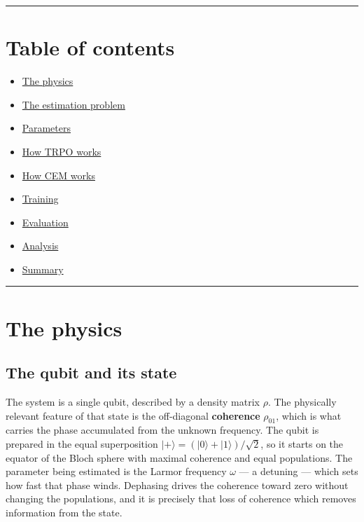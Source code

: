 \documentclass[12pt,a4paper]{article}
\begin{document}
\noindent\rule{\textwidth}{0.4pt}

\section*{Table of contents}
\begin{itemize}
  \item \hyperref[sec:physics]{The physics}
  \item \hyperref[sec:estimation]{The estimation problem}
  \item \hyperref[sec:configuration]{Parameters}
  \item \hyperref[sec:trpo]{How TRPO works}
  \item \hyperref[sec:cem]{How CEM works}
  \item \hyperref[sec:training]{Training}
  \item \hyperref[sec:evaluation]{Evaluation}
  \item \hyperref[sec:analysis]{Analysis}
  \item \hyperref[sec:summary]{Summary}
\end{itemize}

\noindent\rule{\textwidth}{0.4pt}
\FloatBarrier

\section{The physics}
\label{sec:physics}

\subsection{The qubit and its state}
\label{sec:qubit-state}
The system is a single qubit, described by a density matrix $\rho$. The
physically relevant feature of that state is the off-diagonal
\textbf{coherence} $\rho_{01}$, which is what carries the phase accumulated
from the unknown frequency. The qubit is prepared in the equal superposition
$|+\rangle = (|0\rangle + |1\rangle)/\sqrt{2}$, so it starts on the equator
of the Bloch sphere with maximal coherence and equal populations. The
parameter being estimated is the Larmor frequency $\omega$ --- a detuning ---
which sets how fast that phase winds. Dephasing drives the coherence toward
zero without changing the populations, and it is precisely that loss of
coherence which removes information from the state.
\end{document}

